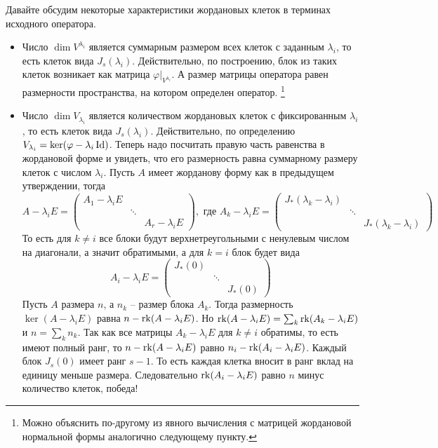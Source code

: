Давайте обсудим некоторые характеристики жордановых клеток в терминах исходного оператора.
\begin{itemize}
\item Число $\dim V^{\lambda_i}$ является суммарным размером всех клеток с заданным $\lambda_i$, то есть клеток вида $J_s(\lambda_i)$.
Действительно, по построению, блок из таких клеток возникает как матрица $\varphi|_{V^{\lambda_i}}$.
А размер матрицы оператора равен размерности пространства, на котором определен оператор.%
\footnote{Можно объяснить по-другому из явного вычисления с матрицей жордановой нормальной формы аналогично следующему пункту.}

\item Число $\dim V_{\lambda_i}$ является количеством жордановых клеток с фиксированным $\lambda_i$, то есть клеток вида $J_s(\lambda_i)$.
Действительно, по определению $V_{\lambda_i} = \ker (\varphi - \lambda_i \operatorname{Id})$.
Теперь надо посчитать правую часть равенства в жордановой форме и увидеть, что его размерность равна суммарному размеру клеток с числом $\lambda_i$.
Пусть $A$ имеет жорданову форму как в предыдущем утверждении, тогда
\[
A -\lambda_i E= 
\begin{pmatrix}
{A_1-\lambda_i E}&{}&{}\\
{}&{\ddots}&{}\\
{}&{}&{A_r - \lambda_i E}
\end{pmatrix},\text{ где }
A_k -\lambda_i E=
\begin{pmatrix}
{J_*(\lambda_k - \lambda_i)}&{}&{}\\
{}&{\ddots}&{}\\
{}&{}&{J_*(\lambda_k - \lambda_i)}
\end{pmatrix}
\]
То есть для $k\neq i$ все блоки будут верхнетреугольными с ненулевым числом на диагонали, а значит обратимыми, а для $k = i$ блок будет вида
\[
A_i -\lambda_i E=
\begin{pmatrix}
{J_*(0)}&{}&{}\\
{}&{\ddots}&{}\\
{}&{}&{J_*(0)}
\end{pmatrix}
\]
Пусть $A$ размера $n$, а $n_k$ -- размер блока $A_k$.
Тогда размерность $\ker (A - \lambda_i E)$ равна $n - \operatorname{rk} (A - \lambda_i E)$.
Но $\operatorname{rk} (A - \lambda_i E) = \sum_k \operatorname{rk} (A_k - \lambda_i E)$ и $n = \sum_k n_k$.
Так как все матрицы $A_k - \lambda_i E$ для $k\neq i$ обратимы, то есть имеют полный ранг, то $n - \operatorname{rk} (A-\lambda_i E)$ равно $n_i - \operatorname{rk} (A_i - \lambda_iE)$.
Каждый блок $J_s(0)$ имеет ранг $s-1$.
То есть каждая клетка вносит в ранг вклад на единицу меньше размера.
Следовательно $\operatorname{rk}(A_i -\lambda_i E)$ равно $n$ минус количество клеток, победа!


\end{itemize}
